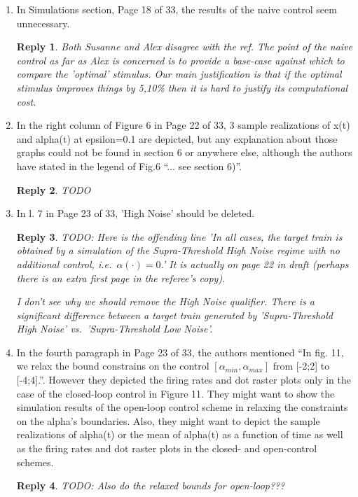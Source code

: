 \documentclass{article}
\newtheorem*{rep}{Reply}
\begin{document}
\begin{enumerate}
\item In Simulations section, Page 18 of 33, the results of the naive control seem
unnecessary.
\begin{rep}
Both Susanne and Alex disagree with the ref. The point of the naive control as
far as Alex is concerned is to provide a base-case against which to compare the 'optimal'
stimulus. Our main justification is that if the optimal stimulus improves things
by 5,10\% then it is hard to justify its computational cost. 
\end{rep}


\item In the right column of Figure 6 in Page 22 of 33, 3 sample realizations of
x(t) and alpha(t) at epsilon=0.1 are depicted, but any explanation about those
graphs could not be found in section 6 or anywhere else, although the authors
have stated in the legend of Fig.6 “... see section 6)”.
\begin{rep}
TODO
\end{rep}

\item In l. 7 in Page 23 of 33, 'High Noise' should be deleted.
\begin{rep}
TODO: Here is the offending line
'In all cases,
the target train is obtained by a simulation of the Supra-Threshold High Noise
regime with no additional control, i.e.\ $\alpha(\cdot) = 0$.' It is actually on
page 22 in draft (perhaps there is an extra first page in the referee's copy).

I don't see why we should remove the High Noise qualifier. There is a
significant difference between a target train generated by 'Supra-Threshold High
Noise' vs.\ 'Supra-Threshold Low Noise'. 
\end{rep}

\item In the fourth paragraph in Page 23 of 33, the authors mentioned “In fig. 11,
we relax the bound constrains on the control $[\alpha_{min}, \alpha_{max}]$ from
[-2;2] to [-4;4].”. However they depicted the firing rates and dot raster plots only in
the case of the closed-loop control in Figure 11. They might want to show the
simulation results of the open-loop control scheme in relaxing the constraints
on the alpha's boundaries. Also, they might want to depict the sample
realizations of alpha(t) or the mean of alpha(t) as a function of time as well
as the firing rates and dot raster plots in the closed- and open-control
schemes.
\begin{rep}
TODO: Also do the relaxed bounds for open-loop???


\end{rep}
\end{enumerate}
\end{document}
